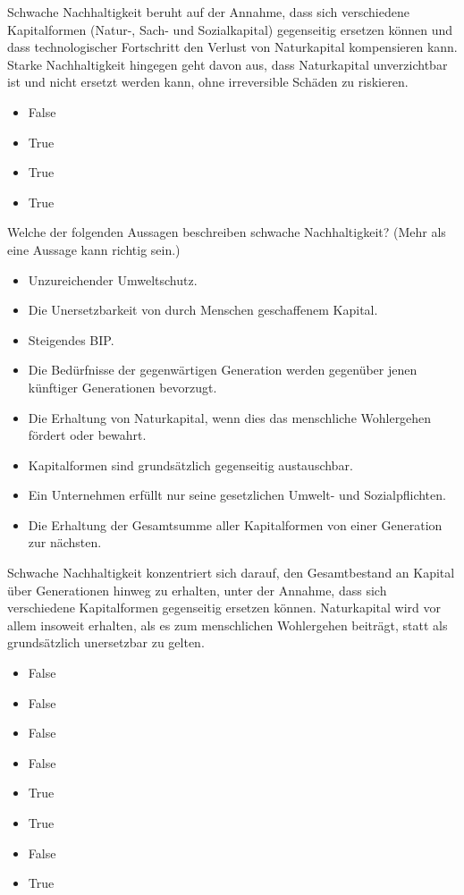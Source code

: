 \documentclass[
  nswissgerman,
  a4paper,
  DIV=11,
  numbers=noendperiod,
  oneside,
  openany]{scrreprt}
\providecommand{\tightlist}{%
  \setlength{\itemsep}{0pt}\setlength{\parskip}{0pt}}
\begin{document}
Schwache Nachhaltigkeit beruht auf der Annahme, dass sich verschiedene
Kapitalformen (Natur-, Sach- und Sozialkapital) gegenseitig ersetzen
können und dass technologischer Fortschritt den Verlust von Naturkapital
kompensieren kann. Starke Nachhaltigkeit hingegen geht davon aus, dass
Naturkapital unverzichtbar ist und nicht ersetzt werden kann, ohne
irreversible Schäden zu riskieren.

\begin{itemize}
\tightlist
\item
  False
\item
  True
\item
  True
\item
  True
\end{itemize}

Welche der folgenden Aussagen beschreiben schwache Nachhaltigkeit? (Mehr
als eine Aussage kann richtig sein.)

\begin{itemize}
\tightlist
\item[$\square$]
  Unzureichender Umweltschutz.
\item[$\square$]
  Die Unersetzbarkeit von durch Menschen geschaffenem Kapital.
\item[$\square$]
  Steigendes BIP.
\item[$\square$]
  Die Bedürfnisse der gegenwärtigen Generation werden gegenüber jenen
  künftiger Generationen bevorzugt.
\item[$\square$]
  Die Erhaltung von Naturkapital, wenn dies das menschliche Wohlergehen
  fördert oder bewahrt.
\item[$\square$]
  Kapitalformen sind grundsätzlich gegenseitig austauschbar.
\item[$\square$]
  Ein Unternehmen erfüllt nur seine gesetzlichen Umwelt- und
  Sozialpflichten.
\item[$\square$]
  Die Erhaltung der Gesamtsumme aller Kapitalformen von einer Generation
  zur nächsten.
\end{itemize}

Schwache Nachhaltigkeit konzentriert sich darauf, den Gesamtbestand an
Kapital über Generationen hinweg zu erhalten, unter der Annahme, dass
sich verschiedene Kapitalformen gegenseitig ersetzen können.
Naturkapital wird vor allem insoweit erhalten, als es zum menschlichen
Wohlergehen beiträgt, statt als grundsätzlich unersetzbar zu gelten.

\begin{itemize}
\tightlist
\item
  False
\item
  False
\item
  False
\item
  False
\item
  True
\item
  True
\item
  False
\item
  True
\end{itemize}
\end{document}
